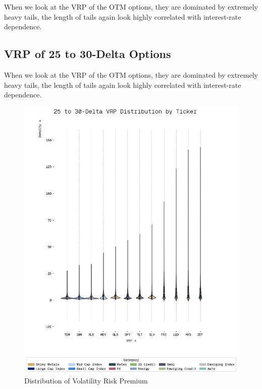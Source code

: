 When we look at the VRP of the OTM options, they are dominated by extremely heavy tails, the length of tails again look highly correlated with interest-rate dependence.

\subsection{VRP of 25 to 30-Delta Options}

When we look at the VRP of the OTM options, they are dominated by extremely heavy tails, the length of tails again look highly correlated with interest-rate dependence.

\begin{figure}[H]
    \centering
    \includegraphics[width=1\textwidth]{images/otm_vrp_violin.png}
    \caption{Distribution of Volatility Risk Premium}
    \label{fig:otm_vrp_violin}
\end{figure}